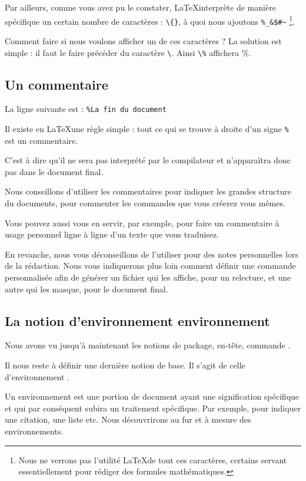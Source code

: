 Par ailleurs, comme vous avez pu le constater, \LaTeX interprète de manière spécifique un certain nombre de caractères : \verb|\{}|, à quoi nous ajoutons \verb|%_&$#~| \footnote{Nous ne verrons pas l'utilité \LaTeX  de tout ces caractères, certains servant essentiellement pour rédiger des formules mathématiques.}.

Comment faire si nous voulons afficher un de ces caractères ? La solution est simple : il faut le faire précéder du caractère \verb|\|. Ainsi \verb|\%| affichera \%.   




\subsection{Un commentaire}

La ligne suivante est : \verb|%La fin du document|

Il existe en \LaTeX une règle simple : tout ce qui se trouve à droite d'un signe \verb|%| est un commentaire.

C'est à dire qu'il ne sera pas interprété par le compilateur et n'apparaîtra donc pas dans le document final. 

Nous conseillons d'utiliser les commentaires pour indiquer les grandes structure du documents, pour commenter les commandes que vous créerez vous mêmes. 

Vous pouvez aussi vous en servir, par exemple, pour faire un commentaire à usage personnel ligne à ligne d'un texte que vous traduisez.

En revanche, nous vous déconseillons de l'utiliser pour des notes personnelles lors de la rédaction. Nous vous indiquerons plus loin  comment définir une commande  personnalisée afin de générer un fichier qui les affiche, pour un relecture, et une autre qui les masque, pour le document final.



\subsection{La notion d'environnement environnement }

Nous avons vu jusqu'à maintenant les notions de  package, en-tête, commande . 

Il nous reste à définir une dernière notion de base. Il s'agit de celle d'environnement .

Un environnement  est une portion de document ayant une signification spécifique et qui par conséquent subira un traitement spécifique. Par exemple, pour indiquer une citation, une liste etc. Nous découvrirons au fur et à mesure  des environnements. 



